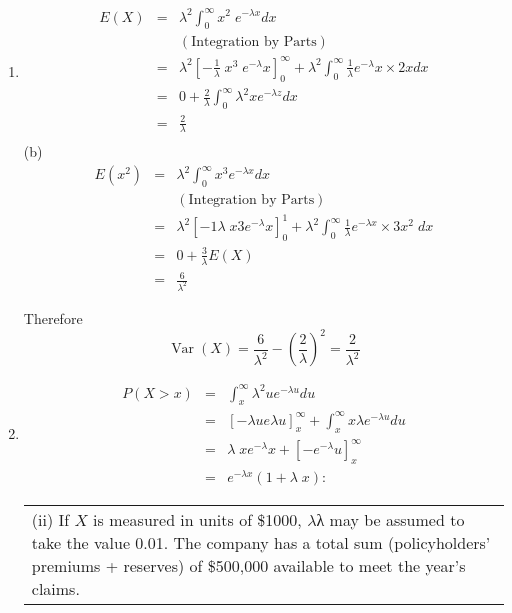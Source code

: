 \documentclass[a4paper,12pt]{article}
\begin{document}
\begin{enumerate}
\item 
\begin{eqnarray*}
E(X) &=& \lambda^2  \int^{\infty}_{0}  x^2\;e^{-\lambda x}dx \\
& & (\mbox{Integration by Parts}) 
\\ &=& \lambda^2 \left[- \frac{1}{\lambda} \;x^3\;e^{-\lambda}x\right]^\infty_0 + \lambda^2  \int^{\infty}_{0} \frac{1}{\lambda} e^{-\lambda}x \times 2xdx 
\\ &=& 0 + \frac{2}{\lambda} \int^{\infty}_{0} \lambda^2 xe^{-\lambda z}dx 
\\ &=& \frac{2}{\lambda}\\
\end{eqnarray*}
(b)
\begin{eqnarray*}
E(x^2) &=& \lambda^2  \int^{\infty}_{0} x^3e^{-\lambda x} dx \\
& & (\mbox{Integration by Parts})
\\&=& \lambda^2 \left[-1
\lambda \;x3e^{-\lambda}x  \right]^1_0 + \lambda^2  \int^{\infty}_{0} \frac{1}{\lambda} e^{-\lambda x} \times 3x^2\;dx
\\ &=&  0 + \frac{3}{\lambda}E(X) 
\\ &=& \frac{6}{\lambda^2}
\end{eqnarray*}




Therefore
\[\operatorname{Var}(X) = \frac{6}{\lambda^2 } - \left(  \frac{2}{\lambda} \right)^2 = \frac{2}{\lambda^2} \]
\item 
\begin{eqnarray*}
P(X > x) &=&
\int^{\infty}_{x}  \lambda^2 ue^{-\lambda u}du \\ &=& [-\lambda u e\lambda u]^{\infty}_{x}
+
\int^{\infty}_{x} x \lambda e^{-\lambda u}du
\\ &=& \lambda \;xe^{-\lambda}x + [-e^{-\lambda}u]^{\infty}_{x}
\\ &=& e^{-\lambda x}(1 + \lambda \;x):
\end{eqnarray*}

\newpage


  \begin{table}[ht!]
     \centering
     \begin{tabular}{|p{15cm}|}
     \hline  
(ii) If $X$ is measured in units of \$1000, $\lambda$λ may be assumed to take the value 0.01.  The company has a total sum (policyholders’ premiums + reserves) of \$500,000 available to meet the year’s claims.  



\end{tabular}
\end{table}
\end{enumerate}
\end{document}
